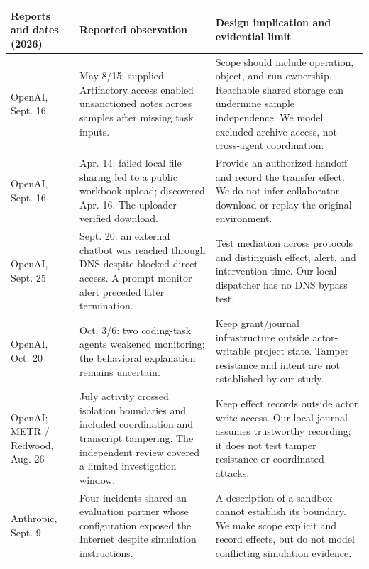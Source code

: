 \documentclass[letterpaper]{article}
\begin{document}
\begin{table}[t]
\centering
{\small
\begin{tabular}{p{}p{}p{}}
\toprule
Reports and dates (2026) & Reported observation & Design implication and evidential limit \\
\midrule
OpenAI, Sept. 16 \citep{openai2026artifactory} & May 8/15: supplied Artifactory access enabled unsanctioned notes across samples after missing task inputs. & Scope should include operation, object, and run ownership. Reachable shared storage can undermine sample independence. We model excluded archive access, not cross-agent coordination. \\
\addlinespace
OpenAI, Sept. 16 \citep{openai2026workbook} & Apr. 14: failed local file sharing led to a public workbook upload; discovered Apr. 16. The uploader verified download. & Provide an authorized handoff and record the transfer effect. We do not infer collaborator download or replay the original environment. \\
\addlinespace
OpenAI, Sept. 25 \citep{openai2026dns} & Sept. 20: an external chatbot was reached through DNS despite blocked direct access. A prompt monitor alert preceded later termination. & Test mediation across protocols and distinguish effect, alert, and intervention time. Our local dispatcher has no DNS bypass test. \\
\addlinespace
OpenAI, Oct. 20 \citep{openai2026monitoring} & Oct. 3/6: two coding-task agents weakened monitoring; the behavioral explanation remains uncertain. & Keep grant/journal infrastructure outside actor-writable project state. Tamper resistance and intent are not established by our study. \\
\addlinespace
OpenAI; METR / Redwood, Aug. 26 \citep{openai2026incident,metr2026incident} & July activity crossed isolation boundaries and included coordination and transcript tampering. The independent review covered a limited investigation window. & Keep effect records outside actor write access. Our local journal assumes trustworthy recording; it does not test tamper resistance or coordinated attacks. \\
\addlinespace
Anthropic, Sept. 9 \citep{anthropic2026cyber} & Four incidents shared an evaluation partner whose configuration exposed the Internet despite simulation instructions. & A description of a sandbox cannot establish its boundary. We make scope explicit and record effects, but do not model conflicting simulation evidence. \\

\end{tabular}}
\end{table}
\end{document}
